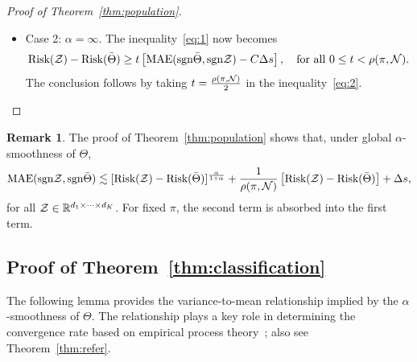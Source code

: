 \documentclass[twoside,11pt]{article}
\theoremstyle{plain}
\theoremstyle{definition}
\newtheorem{rmk}{Remark}
\def\sign{\textup{sgn}}
\def\risk{\textup{Risk}}
\begin{document}
\begin{proof}[Proof of Theorem~\ref{thm:population}]
\begin{itemize}[leftmargin=*,topsep=0pt,itemsep=-1ex,partopsep=1ex,parsep=1ex]
where $C(\pi)>0$ is a multiplicative factor independent of $\tZ$. 
\item Case 2: $\alpha=\infty$. The inequality~\eqref{eq:1} now becomes
\begin{equation}\label{eq:2}
\risk(\tZ)- \risk(\bar \Theta) \geq t\left[\textup{MAE}(\sign \bar\Theta, \sign \tZ)-C\Delta s\right], \quad \text{for all }0\leq t< \rho(\pi,\tN).
\end{equation}
The conclusion follows by taking $t={\rho(\pi, \mathcal{N})\over 2}$ in the inequality~\eqref{eq:2}. 
\end{itemize}
\end{proof}
\begin{rmk}\label{eq:rmk}The proof of Theorem~\ref{thm:population} shows that, under global $\alpha$-smoothness of $\Theta$, 
\begin{equation}\label{eq:remark}
\textup{MAE}(\sign \tZ,\sign \bar \Theta)  \lesssim [\risk(\tZ)- \risk(\bar \Theta)]^{\alpha\over 1+\alpha}+{1\over \rho(\pi, \tN)} \left[\risk(\tZ)- \risk(\bar \Theta)\right]+\Delta s,
\end{equation}
for all $\mathcal{Z}\in\mathbb{R}^{d_1\times \cdots \times d_K}$. For fixed $\pi$, the second term is absorbed into the first term. 
\end{rmk}





\subsection{Proof of Theorem~\ref{thm:classification}}
The following lemma provides the variance-to-mean relationship implied by the $\alpha$-smoothness of $\Theta$. The relationship plays a key role in determining the convergence rate based on empirical process theory~\citep{shen1994convergence}; also see Theorem~\ref{thm:refer}.
\end{document}
